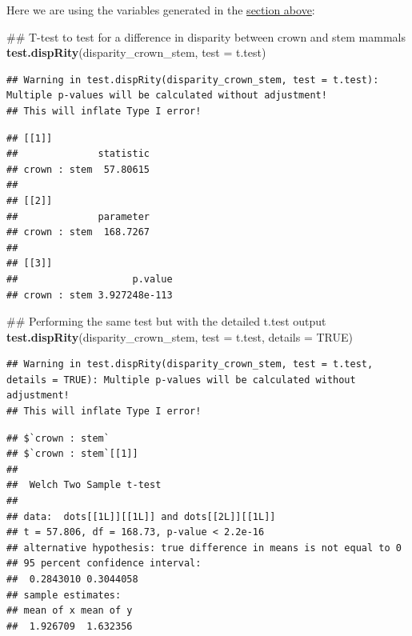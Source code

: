 \documentclass[]{book}
\newenvironment{Shaded}{\begin{snugshade}}{\end{snugshade}}
\newcommand{\KeywordTok}[1]{\textcolor[rgb]{0.13,0.29,0.53}{\textbf{#1}}}
\newcommand{\DataTypeTok}[1]{\textcolor[rgb]{0.13,0.29,0.53}{#1}}
\newcommand{\OtherTok}[1]{\textcolor[rgb]{0.56,0.35,0.01}{#1}}
\newcommand{\NormalTok}[1]{#1}
\theoremstyle{definition}
\theoremstyle{definition}
\theoremstyle{remark}
\begin{document}
Here we are using the variables generated in the
\protect\hyperlink{summarising-dispRity-data-plots}{section above}:

\begin{Shaded}
\begin{Highlighting}[]
\NormalTok{## T-test to test for a difference in disparity between crown and stem mammals}
\KeywordTok{test.dispRity}\NormalTok{(disparity_crown_stem, }\DataTypeTok{test =}\NormalTok{ t.test)}
\end{Highlighting}
\end{Shaded}

\begin{verbatim}
## Warning in test.dispRity(disparity_crown_stem, test = t.test): Multiple p-values will be calculated without adjustment!
## This will inflate Type I error!
\end{verbatim}

\begin{verbatim}
## [[1]]
##              statistic
## crown : stem  57.80615
## 
## [[2]]
##              parameter
## crown : stem  168.7267
## 
## [[3]]
##                    p.value
## crown : stem 3.927248e-113
\end{verbatim}

\begin{Shaded}
\begin{Highlighting}[]
\NormalTok{## Performing the same test but with the detailed t.test output}
\KeywordTok{test.dispRity}\NormalTok{(disparity_crown_stem, }\DataTypeTok{test =}\NormalTok{ t.test, }\DataTypeTok{details =} \OtherTok{TRUE}\NormalTok{)}
\end{Highlighting}
\end{Shaded}

\begin{verbatim}
## Warning in test.dispRity(disparity_crown_stem, test = t.test, details = TRUE): Multiple p-values will be calculated without adjustment!
## This will inflate Type I error!
\end{verbatim}

\begin{verbatim}
## $`crown : stem`
## $`crown : stem`[[1]]
## 
##  Welch Two Sample t-test
## 
## data:  dots[[1L]][[1L]] and dots[[2L]][[1L]]
## t = 57.806, df = 168.73, p-value < 2.2e-16
## alternative hypothesis: true difference in means is not equal to 0
## 95 percent confidence interval:
##  0.2843010 0.3044058
## sample estimates:
## mean of x mean of y 
##  1.926709  1.632356
\end{verbatim}
\end{document}
